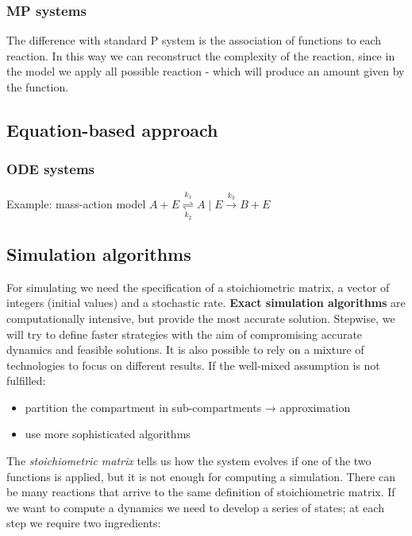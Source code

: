     \subsubsection{MP systems}
    The difference with standard P system is the association of functions to each reaction.
    In this way we can reconstruct the complexity of the reaction, since in the model we apply all possible reaction - which will produce an amount given by the function.

  \subsection{Equation-based approach}

    \subsubsection{ODE systems}
    Example: mass-action model
    \(A+E \underset{k_2}{\overset{k_1}{\rightleftharpoons}}A \mid E \stackrel{k_3}{\longrightarrow}B+E\)

  \subsection{Simulation algorithms}
  For simulating we need the specification of a stoichiometric matrix, a vector of integers (initial values) and a stochastic rate.
  \textbf{Exact simulation algorithms} are computationally intensive, but provide the most accurate solution.
  Stepwise, we will try to define faster strategies with the aim of compromising accurate dynamics and feasible solutions.
  It is also possible to rely on a mixture of technologies to focus on different results.
  If the well-mixed assumption is not fulfilled:

  \begin{itemize}
    \item partition the compartment in sub-compartments → approximation
    \item use more sophisticated algorithms
  \end{itemize}

  \noindent
  The \emph{stoichiometric matrix} tells us how the system evolves if one of the two functions is applied, but it is not enough for computing a simulation.
  There can be many reactions that arrive to the same definition of stoichiometric matrix.
  If we want to compute a dynamics we need to develop a series of states; at each step we require two ingredients:

